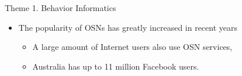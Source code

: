 \documentclass[
 size=14pt,
 paper=smartboard,  %
 mode=present, 		%
 display=slides, 	%
 pauseslide,
 fleqn,leqno]{powerdot}{}
\begin{document}
\begin{slide}[toc=,bm=]{Theme 1. Behavior Informatics}

\begin{itemize}
\item
The popularity of OSNs has greatly increased in recent years

\begin{itemize}
\item
A large amount of Internet users also use OSN services,

\item
Australia has up to 11 million Facebook users.
\end{itemize}

\end{itemize}

\begin{figure}[htbp]
    \centering
\end{figure}

\end{slide}
\end{document}
